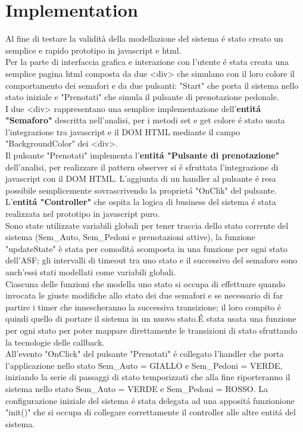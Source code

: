 \documentclass{llncs}
\newcommand{\labelsec}[1]{\label{sec:#1}}
\begin{document}
\section{Implementation}
\labelsec{Implementation}
Al fine di testare la validità della modellazione del sistema \'e stato creato un semplice e rapido prototipo in javascript e html. \\
Per la parte di interfaccia grafica e interazione con l'utente \'e stata creata una semplice pagina html composta da due <div> che simulano con il loro colore il comportamento dei semafori e da due pulsanti: "Start" che porta il sistema nello stato iniziale e "Prenotati" che simula il pulsante di prenotazione pedonale.\\
I due <div> rappresentano una semplice implementazione dell'\textbf{entit\'a "Semaforo"} descritta nell'analisi, per i metodi set e get colore \'e stato usata l'integrazione tra javascript e il DOM HTML mediante il campo "BackgroundColor" dei <div>.\\
Il pulsante "Prenotati" implementa l'\textbf{entit\'a "Pulsante di prenotazione"} dell'analisi, per realizzare il pattern observer si \'e sfruttata l'integrazione di javascript con il DOM HTML. L'aggiunta di un handler al pulsante \'e resa possibile semplicemente sovrascrivendo la propriet\'a "OnClik" del pulsante.\\
L'\textbf{entit\'a "Controller"} che ospita la logica di business del sistema \'e stata realizzata nel prototipo in javascript puro.\\
Sono state utilizzate variabili globali per tener traccia dello stato corrente del sistema (Sem\_Auto, Sem\_Pedoni e prenotazioni attive), la funzione "updateState" è stata per comodit\'a scomposta in una funzione per ogni stato dell'ASF; gli intervalli di timeout tra uno stato e il successivo del semaforo sono anch'essi stati modellati come variabili globali.\\
Ciascuna delle funzioni che modella uno stato si occupa di effettuare quando invocata le giuste modifiche allo stato dei due semafori e se necessario di far partire i timer che innescheranno la successiva transizione; il loro compito \'e quindi quello di portare il sistema in un nuovo stato.\'E stata usata una funzione per ogni stato per poter mappare direttamente le transizioni di stato sfruttando la tecnologie delle callback.\\
All'evento "OnClick" del pulsante "Prenotati" \'e collegato l'handler che porta l'applicazione nello stato Sem\_Auto = GIALLO e Sem\_Pedoni = VERDE, iniziando la serie di passaggi di stato temporizzati che alla fine riporteranno il sistema nello stato Sem\_Auto = VERDE e Sem\_Pedoni = ROSSO. La configurazione iniziale del sistema \'e stata delegata ad una apposit\'a funzionione "init()" che si occupa di collegare correttamente il controller alle altre entit\'a del sistema.\\
\end{document}
